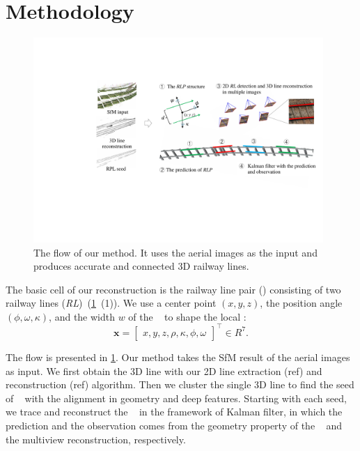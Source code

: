 \section{Methodology}
\begin{figure}
    \centering
    \includegraphics[width=0.98\textwidth]{images/overview.pdf}
    \caption{The flow of our method.
    It uses the aerial images as the input and produces accurate
    and connected 3D railway lines.}
    \label{fig_overview}
\end{figure}


The basic cell of our reconstruction is the railway line pair (\rlp) consisting of two railway lines (\textit{RL})~(\cref{fig_overview}~(1)).
We use a center point $\left(x,y,z\right)$,
the position angle $\left(\phi,\omega,\kappa\right)$,
and the width $w$ of the \rlp~ to shape the local \rlp:
\begin{equation}
\mathbf x = \begin{bmatrix}
    x,y,z,\rho,\kappa,\phi,\omega
\end{bmatrix}^ \top \in R^{7}.
\label{eq_prediction3} 
\end{equation}

The flow is presented in \cref{fig_overview}. 
Our method takes the SfM result of the aerial images as input.
We first obtain the 3D line with our 2D line extraction (ref) and reconstruction (ref) algorithm.
Then
we cluster the single 3D line to find the seed of \rlp~ with the alignment in geometry and deep features.
Starting with each seed,
we trace and reconstruct the \rlp~ in the framework of Kalman filter,
in which the prediction and the observation comes from the geometry property of the \rlp~ 
and the multiview reconstruction,
respectively.


